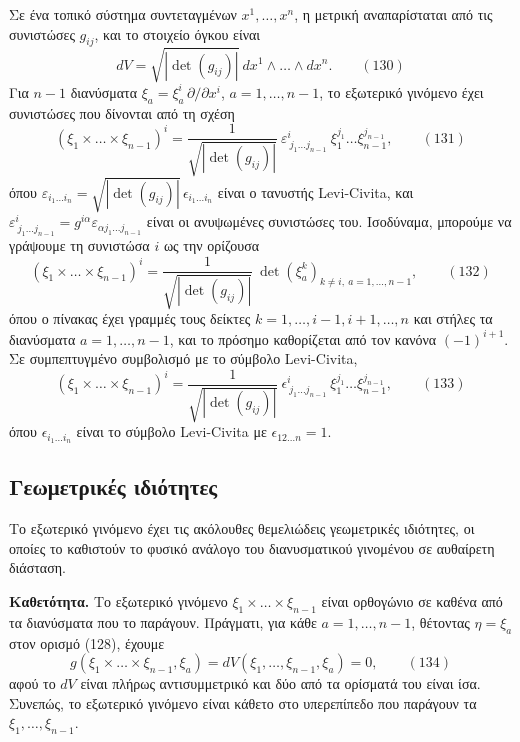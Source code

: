 \documentclass[12pt]{article}
\begin{document}
Σε ένα τοπικό σύστημα συντεταγμένων $x^1, \dots, x^n$, η μετρική αναπαρίσταται από τις συνιστώσες $g_{ij}$, και το στοιχείο όγκου είναι
\begin{equation}
dV = \sqrt{|\det(g_{ij})|} \ dx^1 \wedge \dots \wedge dx^n. \qquad (130)
\end{equation}
Για $n-1$ διανύσματα $\xi_a = \xi_a^i \, \partial / \partial x^i$, $a = 1, \dots, n-1$, το εξωτερικό γινόμενο έχει συνιστώσες που δίνονται από τη σχέση
\begin{equation}
(\xi_1 \times \dots \times \xi_{n-1})^i = \frac{1}{\sqrt{|\det(g_{ij})|}} \ \varepsilon^{i}_{\ j_1 \dots j_{n-1}} \ \xi_1^{j_1} \dots \xi_{n-1}^{j_{n-1}}, \qquad (131)
\end{equation}
όπου $\varepsilon_{i_1 \dots i_n} = \sqrt{|\det(g_{ij})|} \, \epsilon_{i_1 \dots i_n}$ είναι ο τανυστής Levi-Civita, και $\varepsilon^{i}_{\ j_1 \dots j_{n-1}} = g^{i\alpha} \varepsilon_{\alpha j_1 \dots j_{n-1}}$ είναι οι ανυψωμένες συνιστώσες του. Ισοδύναμα, μπορούμε να γράψουμε τη συνιστώσα $i$ ως την ορίζουσα
\begin{equation}
(\xi_1 \times \dots \times \xi_{n-1})^i = \frac{1}{\sqrt{|\det(g_{ij})|}} \ \det \left( \xi_a^{k} \right)_{k \neq i, \ a=1, \dots, n-1}, \qquad (132)
\end{equation}
όπου ο πίνακας έχει γραμμές τους δείκτες $k = 1, \dots, i-1, i+1, \dots, n$ και στήλες τα διανύσματα $a = 1, \dots, n-1$, και το πρόσημο καθορίζεται από τον κανόνα $(-1)^{i+1}$. Σε συμπεπτυγμένο συμβολισμό με το σύμβολο Levi-Civita,
\begin{equation}
(\xi_1 \times \dots \times \xi_{n-1})^i = \frac{1}{\sqrt{|\det(g_{ij})|}} \ \epsilon^{i}_{\ j_1 \dots j_{n-1}} \ \xi_1^{j_1} \dots \xi_{n-1}^{j_{n-1}}, \qquad (133)
\end{equation}
όπου $\epsilon_{i_1 \dots i_n}$ είναι το σύμβολο Levi-Civita με $\epsilon_{12\dots n} = 1$.

\subsection{Γεωμετρικές ιδιότητες}

Το εξωτερικό γινόμενο έχει τις ακόλουθες θεμελιώδεις γεωμετρικές ιδιότητες, οι οποίες το καθιστούν το φυσικό ανάλογο του διανυσματικού γινομένου σε αυθαίρετη διάσταση.

\textbf{Καθετότητα.} Το εξωτερικό γινόμενο $\xi_1 \times \dots \times \xi_{n-1}$ είναι ορθογώνιο σε καθένα από τα διανύσματα που το παράγουν. Πράγματι, για κάθε $a = 1, \dots, n-1$, θέτοντας $\eta = \xi_a$ στον ορισμό (128), έχουμε
\begin{equation}
g(\xi_1 \times \dots \times \xi_{n-1}, \xi_a) = dV(\xi_1, \dots, \xi_{n-1}, \xi_a) = 0, \qquad (134)
\end{equation}
αφού το $dV$ είναι πλήρως αντισυμμετρικό και δύο από τα ορίσματά του είναι ίσα. Συνεπώς, το εξωτερικό γινόμενο είναι κάθετο στο υπερεπίπεδο που παράγουν τα $\xi_1, \dots, \xi_{n-1}$.
\end{document}
